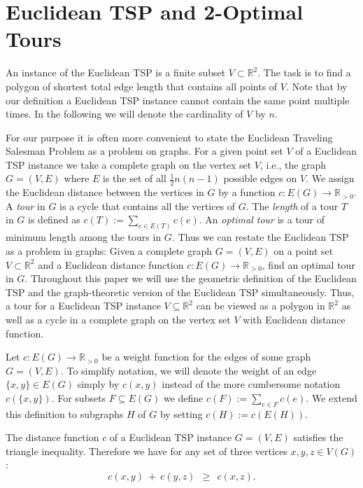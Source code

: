 \documentclass[a4paper, 11pt]{article}
\begin{document}
 
 
 

\section{Euclidean TSP and 2-Optimal Tours}
\label{sec:notation}

An instance of the Euclidean TSP is a finite subset $V\subset \mathbb{R}^2$. 
The task is to find a polygon of shortest total edge length that contains all points of $V$.
Note that by our definition a Euclidean TSP instance cannot contain the same point multiple times.
In the following we will denote the cardinality of $V$ by $n$.

For our purpose it is often more convenient to state the Euclidean Traveling Salesman Problem as a problem on graphs. 
For a given point set $V$ of a Euclidean TSP instance we take a complete graph on the vertex set $V$, i.e., the graph $G=(V,E)$
where $E$ is the set of all $\frac12  n(n-1)$ possible edges on $V$. We assign the Euclidean  
distance between the vertices in $G$ by a function  $c:E(G) \to \mathbb{R}_{> 0}$.
A \emph{tour} in $G$ is a cycle that contains all the vertices of $G$.
The \emph{length} of a tour $T$ in $G$ is defined as $c(T) := \sum_{e\in E(T)} c(e)$.  
An \emph{optimal tour} is a tour of minimum length among the tours in $G$. 
Thus we can restate the Euclidean TSP as a problem in graphs: 
Given a complete graph $G=(V,E)$ on a point set $V\subset \mathbb{R}^2$ and a Euclidean distance function $c:E(G) \to \mathbb{R}_{> 0}$, 
find an optimal tour in $G$. 
Throughout this paper we will use the geometric definition of the Euclidean TSP and the graph-theoretic version of the
Euclidean TSP simultaneously. Thus, a tour for a Euclidean TSP instance $V\subseteq \mathbb{R}^2$ can be viewed as a polygon in  $\mathbb{R}^2$ as well as
a cycle in a complete graph on the vertex set $V$ with Euclidean distance function.     


Let $c:E(G)\to\mathbb{R}_{>0}$ be a weight function for the edges of some graph $G=(V,E)$. 
To simplify notation, we will denote the weight of an edge $\{x,y\} \in E(G)$ simply by $c(x,y)$ instead 
of the more cumbersome notation $c(\{x,y\})$. For subsets $F\subseteq E(G)$ we define
$c(F) := \sum_{e\in F} c(e)$. We extend this definition to subgraphs $H$ of $G$ by setting $c(H) := c(E(H))$.

The distance function $c$ of a Euclidean TSP instance $G=(V,E)$ satisfies the triangle inequality. Therefore we have 
for any set of three vertices $x, y, z\in V(G)$:
\begin{equation}
c(x,y) ~+~ c(y, z) ~ ~\ge~ ~ c(x, z).
\end{equation}
\end{document}
